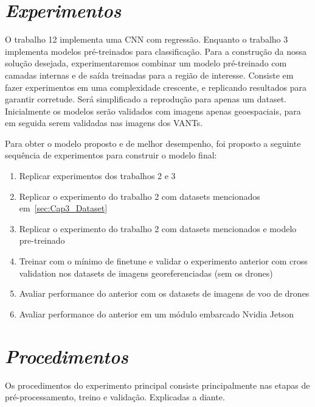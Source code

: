 

\section{\textit{Experimentos}}\label{sec:Cap3_Experimentos}

O trabalho 12 implementa uma CNN com regressão. Enquanto o trabalho 3 implementa modelos pré-treinados para classificação. Para a construção da nossa solução desejada, experimentaremos combinar um modelo pré-treinado com camadas internas e de saída treinadas para a região de interesse.
Consiste em fazer experimentos em uma complexidade crescente, e replicando resultados para garantir corretude. Será simplificado a reprodução para apenas um dataset.
Inicialmente os modelos serão validados com imagens apenas geoespaciais, para em seguida serem validadas nas imagens dos VANTs.

Para obter o modelo proposto e de melhor desempenho, foi proposto a seguinte sequência de experimentos para construir o modelo final:

\begin{enumerate}
\item  Replicar experimentos dos trabalhos 2 e 3
\item  Replicar o experimento do trabalho 2 com datasets mencionados em~\ref{sec:Cap3_Dataset}
\item  Replicar o experimento do trabalho 2 com datasets mencionados e modelo pre-treinado
\item Treinar com o mínimo de finetune e validar o experimento anterior com cross validation nos datasets de imagens georeferenciadas (sem os drones)
\item Avaliar performance do anterior com os datasets de imagens de voo de drones
\item Avaliar performance do anterior em um módulo embarcado Nvidia Jetson
\end{enumerate}


    

\section{\textit{Procedimentos}}\label{sec:Cap3_Procedimentos}

Os procedimentos do experimento principal consiste principalmente nas etapas de 
pré-processamento, treino e validação. Explicadas a diante.

